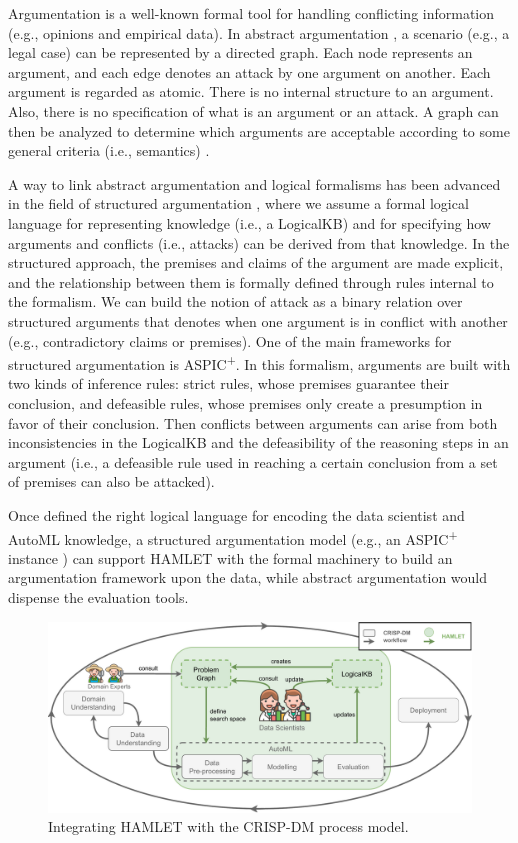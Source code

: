 Argumentation is a well-known formal tool for handling conflicting information (e.g., opinions and empirical data).
In abstract argumentation \cite{Dung1995abstractArg}, a scenario (e.g., a legal case) can be represented by a directed graph.
Each node represents an argument, and each edge denotes an attack by one argument on another. Each argument is regarded as atomic. There is no internal structure to an argument. Also, there is no specification of what is an argument or an attack. A graph can then be analyzed to determine which arguments are acceptable according to some general criteria (i.e., semantics) \cite{baroniCG11semantics}.

A way to link abstract argumentation and logical formalisms has been advanced in the field of structured argumentation \cite{BesnardGHMPST14structured}, where we assume a formal logical language for representing knowledge (i.e., a LogicalKB) and for specifying how arguments and conflicts (i.e., attacks) can be derived from that knowledge. 
In the structured approach, the premises and claims of the argument are made explicit, and the relationship between them is formally defined through rules internal to the formalism.
We can build the notion of attack as a binary relation over structured arguments that denotes when one argument is in conflict with another (e.g., contradictory claims or premises).
One of the main frameworks for structured argumentation is ASPIC\textsuperscript{+}\cite{Modgil2014aspic+}.
In this formalism, arguments are built with two kinds of inference rules: strict rules, whose premises guarantee their conclusion, and defeasible rules, whose premises only create a presumption in favor of their conclusion.
Then conflicts between arguments can arise from both inconsistencies in the LogicalKB and the defeasibility of the reasoning steps in an argument (i.e., a defeasible rule used in reaching a certain conclusion from a set of premises can also be attacked).

Once defined the right logical language for encoding the data scientist and AutoML knowledge, a structured argumentation model (e.g., an ASPIC\textsuperscript{+} instance \cite{arg2p-jlc}) can support HAMLET with the formal machinery to build an argumentation framework upon the data, while abstract argumentation would dispense the evaluation tools.


\begin{figure}[t]
    \centering
    \includegraphics[width=1\columnwidth]{chapters/human-centric/hamlet/img/dymmymodel.pdf}
    \caption{Integrating HAMLET with the CRISP-DM process model.}
    \label{hamlet-fig:approach}
\end{figure}
